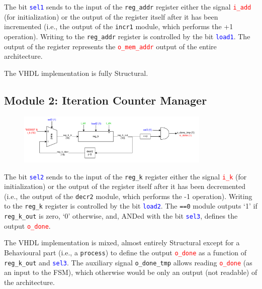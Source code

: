 \documentclass{article}
\begin{document}
The bit \texttt{\textcolor{blue}{sel1}} sends to the input of the \texttt{reg\_addr} register either the signal \texttt{\textcolor{red}{i\_add}} (for initialization) or the output of the register itself after it has been incremented (i.e., the output of the \texttt{incr1} module, which performs the +1 operation). Writing to the \texttt{reg\_addr} register is controlled by the bit \texttt{\textcolor{blue}{load1}}. The output of the register represents the \texttt{\textcolor{red}{o\_mem\_addr}} output of the entire architecture.

The VHDL implementation is fully Structural.

\subsection{Module 2: Iteration Counter Manager}

\begin{figure}[H]
  \centering
  \includegraphics[width=0.82\textwidth]{modulo2.pdf}
  \label{fig:Module 2: Iteration Counter Manager}
\end{figure}

The bit \texttt{\textcolor{blue}{sel2}} sends to the input of the \texttt{reg\_k} register either the signal \texttt{\textcolor{red}{i\_k}} (for initialization) or the output of the register itself after it has been decremented (i.e., the output of the \texttt{decr2} module, which performs the -1 operation). Writing to the \texttt{reg\_k} register is controlled by the bit \texttt{\textcolor{blue}{load2}}. The \texttt{==0} module outputs ‘1’ if \texttt{reg\_k\_out} is zero, ‘0’ otherwise, and, ANDed with the bit \texttt{\textcolor{blue}{sel3}}, defines the output \texttt{\textcolor{red}{o\_done}}.

The VHDL implementation is mixed, almost entirely Structural except for a Behavioural part (i.e., a \texttt{process}) to define the output \texttt{\textcolor{red}{o\_done}} as a function of \texttt{reg\_k\_out} and \texttt{\textcolor{blue}{sel3}}. The auxiliary signal \texttt{o\_done\_tmp} allows reading \texttt{\textcolor{red}{o\_done}} (as an input to the FSM), which otherwise would be only an output (not readable) of the architecture.
\end{document}
